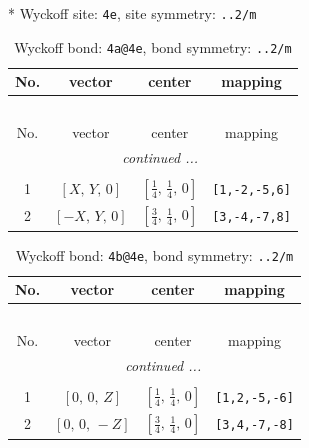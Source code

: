 \documentclass[fleqn,8pt]{jsarticle}
\begin{document}
* Wyckoff site: {\tt 4e}, site symmetry: {\tt ..2/m}
\renewcommand{\arraystretch}{1.2}
\begin{longtable}{cccc}
\caption{Wyckoff bond: {\tt 4a@4e}, bond symmetry: {\tt ..2/m}}
 \\
 \hline \hline
No. & vector & center & mapping \\ \hline \endfirsthead

\multicolumn{3}{l}{\tablename\ \thetable{}} \\
 \hline \hline
No. & vector & center & mapping \\ \hline \endhead

 \hline \hline
\multicolumn{3}{r}{\footnotesize\it continued ...} \\ \endfoot

 \hline \hline
\multicolumn{3}{r}{} \\ \endlastfoot

1 & $\left[ X,\, Y,\, 0 \right]$ & $\left[ \frac{1}{4},\, \frac{1}{4},\, 0 \right]$ & {\tt [1,-2,-5,6]} \\ \hline
2 & $\left[ - X,\, Y,\, 0 \right]$ & $\left[ \frac{3}{4},\, \frac{1}{4},\, 0 \right]$ & {\tt [3,-4,-7,8]} \\
\end{longtable}
\renewcommand{\arraystretch}{1.2}
\begin{longtable}{cccc}
\caption{Wyckoff bond: {\tt 4b@4e}, bond symmetry: {\tt ..2/m}}
 \\
 \hline \hline
No. & vector & center & mapping \\ \hline \endfirsthead

\multicolumn{3}{l}{\tablename\ \thetable{}} \\
 \hline \hline
No. & vector & center & mapping \\ \hline \endhead

 \hline \hline
\multicolumn{3}{r}{\footnotesize\it continued ...} \\ \endfoot

 \hline \hline
\multicolumn{3}{r}{} \\ \endlastfoot

1 & $\left[ 0,\, 0,\, Z \right]$ & $\left[ \frac{1}{4},\, \frac{1}{4},\, 0 \right]$ & {\tt [1,2,-5,-6]} \\ \hline
2 & $\left[ 0,\, 0,\, - Z \right]$ & $\left[ \frac{3}{4},\, \frac{1}{4},\, 0 \right]$ & {\tt [3,4,-7,-8]} \\
\end{longtable}
\renewcommand{\arraystretch}{1.2}
\end{document}
